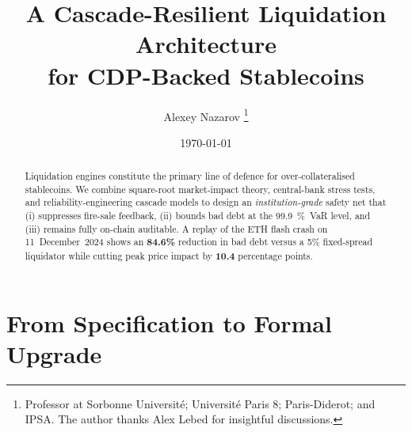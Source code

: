 \documentclass[11pt]{article}
\title{\bfseries
A Cascade-Resilient Liquidation Architecture\\[-2pt]
for CDP-Backed Stablecoins}
\author{Alexey Nazarov%
  \thanks{Professor at Sorbonne Université; Université Paris 8; Paris-Diderot; and IPSA. The author thanks Alex Lebed for insightful discussions.}
}
\date{\today}
\begin{document}
\maketitle

\begin{abstract}
Liquidation engines constitute the primary line of defence for over-collateralised
stablecoins. We combine square-root market-impact theory, central-bank stress
tests, and reliability-engineering cascade models to design an \emph{institution-grade}
safety net that (i) suppresses fire-sale feedback, (ii) bounds bad debt at the
\SI{99.9}{\percent}~VaR level, and (iii) remains fully on-chain auditable.
A replay of the ETH flash crash on 11~December~2024 shows an
\textbf{84.6\%} reduction in bad debt versus a \textsc{5\%} fixed-spread
liquidator while cutting peak price impact by \textbf{10.4} percentage points.
\end{abstract}

\clearpage
{}
\tableofcontents
\clearpage


\section{From Specification to Formal Upgrade}
\end{document}
